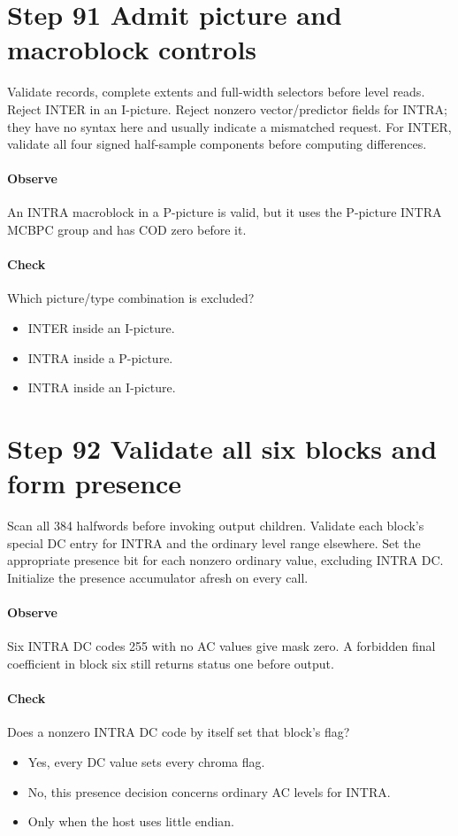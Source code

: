 \section{Step 91 Admit picture and macroblock controls}\label{h263-syntax-s01}
Validate records, complete extents and full-width selectors before level reads.
Reject INTER in an I-picture. Reject nonzero vector/predictor fields for INTRA;
they have no syntax here and usually indicate a mismatched request. For INTER,
validate all four signed half-sample components before computing differences.

\paragraph{Observe} An INTRA macroblock in a P-picture is valid, but it uses the
P-picture INTRA MCBPC group and has COD zero before it.
\paragraph{Check} Which picture/type combination is excluded?
\begin{itemize}
  \item[A.] INTER inside an I-picture.
  \item[B.] INTRA inside a P-picture.
  \item[C.] INTRA inside an I-picture.
\end{itemize}

\section{Step 92 Validate all six blocks and form presence}\label{h263-syntax-s02}
Scan all 384 halfwords before invoking output children. Validate each block's
special DC entry for INTRA and the ordinary level range elsewhere. Set the
appropriate presence bit for each nonzero ordinary value, excluding INTRA DC.
Initialize the presence accumulator afresh on every call.

\paragraph{Observe} Six INTRA DC codes 255 with no AC values give mask zero.
A forbidden final coefficient in block six still returns status one before output.
\paragraph{Check} Does a nonzero INTRA DC code by itself set that block's flag?
\begin{itemize}
  \item[A.] Yes, every DC value sets every chroma flag.
  \item[B.] No, this presence decision concerns ordinary AC levels for INTRA.
  \item[C.] Only when the host uses little endian.
\end{itemize}

